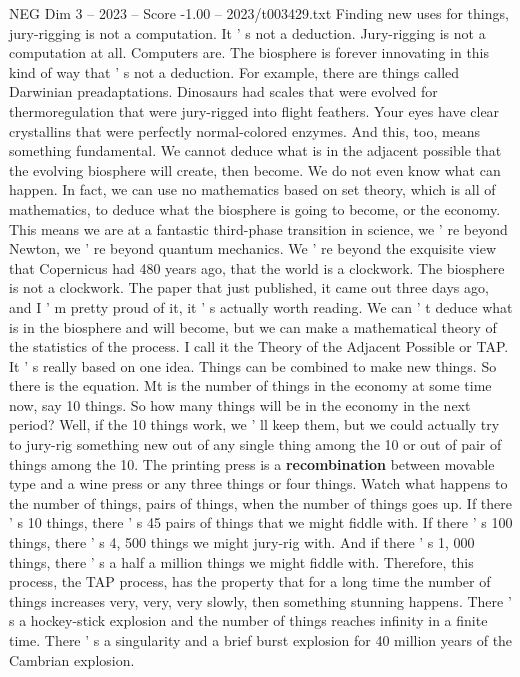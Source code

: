 \begin{textsample}{NEG Dim 3 – 2023 – Score -1.00 – 2023/t003429.txt}
Finding new uses for things, jury-rigging is not a computation.
It ' s not a deduction.
Jury-rigging is not a computation at all.
Computers are.
The biosphere is forever innovating in this kind of way that ' s not a deduction.
For example, there are things called Darwinian preadaptations.
Dinosaurs had scales that were evolved for thermoregulation that were jury-rigged into flight feathers.
Your eyes have clear crystallins that were perfectly normal-colored enzymes.
And this, too, means something fundamental.
We cannot deduce what is in the adjacent possible that the evolving biosphere will create, then become.
We do not even know what can happen.
In fact, we can use no mathematics based on set theory, which is all of mathematics, to deduce what the biosphere is going to become, or the economy.
This means we are at a fantastic third-phase transition in science, we ' re beyond Newton, we ' re beyond quantum mechanics.
We ' re beyond the exquisite view that Copernicus had 480 years ago, that the world is a clockwork.
The biosphere is not a clockwork.
The paper that just published, it came out three days ago, and I ' m pretty proud of it, it ' s actually worth reading.
We can ' t deduce what is in the biosphere and will become, but we can make a mathematical theory of the statistics of the process.
I call it the Theory of the Adjacent Possible or TAP.
It ' s really based on one idea.
Things can be combined to make new things.
So there is the equation.
Mt is the number of things in the economy at some time now, say 10 things.
So how many things will be in the economy in the next period?
Well, if the 10 things work, we ' ll keep them, but we could actually try to jury-rig something new out of any single thing among the 10 or out of pair of things among the 10.
The printing press is a \textbf{recombination} between movable type and a wine press or any three things or four things.
Watch what happens to the number of things, pairs of things, when the number of things goes up.
If there ' s 10 things, there ' s 45 pairs of things that we might fiddle with.
If there ' s 100 things, there ' s 4, 500 things we might jury-rig with.
And if there ' s 1, 000 things, there ' s a half a million things we might fiddle with.
Therefore, this process, the TAP process, has the property that for a long time the number of things increases very, very, very slowly, then something stunning happens.
There ' s a hockey-stick explosion and the number of things reaches infinity in a finite time.
There ' s a singularity and a brief burst explosion for 40 million years of the Cambrian explosion.

\end{textsample}
